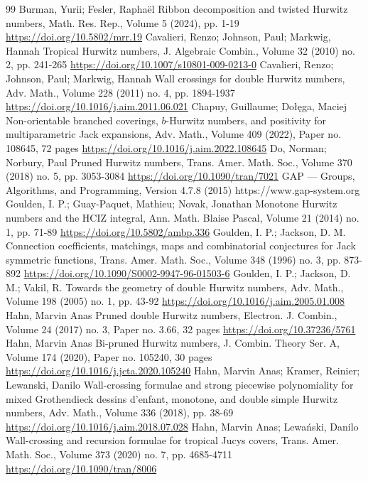 \documentclass[10pt]{amsart}
\theoremstyle{plain}
\theoremstyle{definition}
\theoremstyle{definition}
\theoremstyle{plain}
\theoremstyle{plain}
\theoremstyle{remark}
\theoremstyle{plain}
\theoremstyle{plain}
\begin{document}
\begin{thebibliography}{99}
 Burman, Yurii; Fesler, Raphaël Ribbon decomposition and twisted Hurwitz numbers, Math. Res. Rep., Volume 5 (2024), pp. 1-19 \url{https://doi.org/10.5802/mrr.19}
 Cavalieri, Renzo; Johnson, Paul; Markwig, Hannah Tropical Hurwitz numbers, J. Algebraic Combin., Volume 32 (2010) no. 2, pp. 241-265 \url{https://doi.org/10.1007/s10801-009-0213-0}
 Cavalieri, Renzo; Johnson, Paul; Markwig, Hannah Wall crossings for double Hurwitz numbers, Adv. Math., Volume 228 (2011) no. 4, pp. 1894-1937 \url{https://doi.org/10.1016/j.aim.2011.06.021}
 Chapuy, Guillaume; Dołęga, Maciej Non-orientable branched coverings, $b$-Hurwitz numbers, and positivity for multiparametric Jack expansions, Adv. Math., Volume 409 (2022), Paper no. 108645, 72 pages \url{https://doi.org/10.1016/j.aim.2022.108645}
 Do, Norman; Norbury, Paul Pruned Hurwitz numbers, Trans. Amer. Math. Soc., Volume 370 (2018) no. 5, pp. 3053-3084 \url{https://doi.org/10.1090/tran/7021}
 GAP — Groups, Algorithms, and Programming, Version 4.7.8 (2015) https://www.gap-system.org
 Goulden, I. P.; Guay-Paquet, Mathieu; Novak, Jonathan Monotone Hurwitz numbers and the HCIZ integral, Ann. Math. Blaise Pascal, Volume 21 (2014) no. 1, pp. 71-89 \url{https://doi.org/10.5802/ambp.336}
 Goulden, I. P.; Jackson, D. M. Connection coefficients, matchings, maps and combinatorial conjectures for Jack symmetric functions, Trans. Amer. Math. Soc., Volume 348 (1996) no. 3, pp. 873-892 \url{https://doi.org/10.1090/S0002-9947-96-01503-6}
 Goulden, I. P.; Jackson, D. M.; Vakil, R. Towards the geometry of double Hurwitz numbers, Adv. Math., Volume 198 (2005) no. 1, pp. 43-92 \url{https://doi.org/10.1016/j.aim.2005.01.008}
 Hahn, Marvin Anas Pruned double Hurwitz numbers, Electron. J. Combin., Volume 24 (2017) no. 3, Paper no. 3.66, 32 pages \url{https://doi.org/10.37236/5761}
 Hahn, Marvin Anas Bi-pruned Hurwitz numbers, J. Combin. Theory Ser. A, Volume 174 (2020), Paper no. 105240, 30 pages \url{https://doi.org/10.1016/j.jcta.2020.105240}
 Hahn, Marvin Anas; Kramer, Reinier; Lewanski, Danilo Wall-crossing formulae and strong piecewise polynomiality for mixed Grothendieck dessins d’enfant, monotone, and double simple Hurwitz numbers, Adv. Math., Volume 336 (2018), pp. 38-69 \url{https://doi.org/10.1016/j.aim.2018.07.028}
 Hahn, Marvin Anas; Lewański, Danilo Wall-crossing and recursion formulae for tropical Jucys covers, Trans. Amer. Math. Soc., Volume 373 (2020) no. 7, pp. 4685-4711 \url{https://doi.org/10.1090/tran/8006}

\end{thebibliography}
\end{document}
